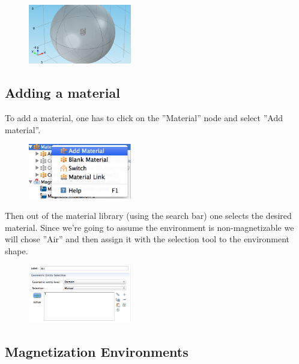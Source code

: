 \begin{figure}[H]
	\centering
  \includegraphics[width=0.4\textwidth]{Pictures/Screenshots/Sim8.png}
\end{figure}

\subsection{Adding a material}

To add a material, one has to click on the ''Material'' node and select ''Add material''.\\
 \begin{figure}[H]
\centering
 \includegraphics[width=0.4\textwidth]{Pictures/Screenshots/Sim14.png}
\end{figure}

Then out of the material library (using the search bar) one selects the desired material. Since we're going to assume the environment is non-magnetizable we will chose ''Air'' and then assign it with the selection tool to the environment shape.\\

 \begin{figure}[H]
\centering
 \includegraphics[width=0.4\textwidth]{Pictures/Screenshots/Sim15.png}
\end{figure}

\subsection{Magnetization Environments}

